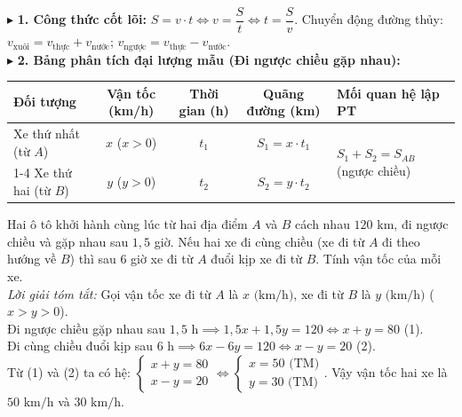 \documentclass[11pt,a4paper]{article}
\begin{document}

\vspace{0.5mm}
\noindent$\blacktriangleright$ \textbf{1. Công thức cốt lõi:} $S = v \cdot t \iff v = \dfrac{S}{t} \iff t = \dfrac{S}{v}$. Chuyển động đường thủy: $v_{\text{xuôi}} = v_{\text{thực}} + v_{\text{nước}}$; $v_{\text{ngược}} = v_{\text{thực}} - v_{\text{nước}}$.\\
$\blacktriangleright$ \textbf{2. Bảng phân tích đại lượng mẫu (Đi ngược chiều gặp nhau):}
\begin{center}
\small
\begin{tabular}{|l|c|c|c|l|}
\hline
\textbf{Đối tượng} & \textbf{Vận tốc (km/h)} & \textbf{Thời gian (h)} & \textbf{Quãng đường (km)} & \textbf{Mối quan hệ lập PT} \\ \hline
Xe thứ nhất (từ $A$) & $x$ ($x > 0$) & $t_1$ & $S_1 = x \cdot t_1$ & \multirow{2}{*}{$S_1 + S_2 = S_{AB}$ (ngược chiều)} \\ \cline{1-4}
Xe thứ hai (từ $B$) & $y$ ($y > 0$) & $t_2$ & $S_2 = y \cdot t_2$ & $S_1 - S_2 = S_{AB}$ (đuổi kịp) \\ \hline
\end{tabular}
\end{center}

\vspace{-0.5mm}
\begin{vidubox}
Hai ô tô khởi hành cùng lúc từ hai địa điểm $A$ và $B$ cách nhau $120\text{ km}$, đi ngược chiều và gặp nhau sau $1{,}5$ giờ. Nếu hai xe đi cùng chiều (xe đi từ $A$ đi theo hướng về $B$) thì sau $6$ giờ xe đi từ $A$ đuổi kịp xe đi từ $B$. Tính vận tốc của mỗi xe.\\
\textit{Lời giải tóm tắt:} Gọi vận tốc xe đi từ $A$ là $x\text{ (km/h)}$, xe đi từ $B$ là $y\text{ (km/h)}$ ($x > y > 0$).\\
Đi ngược chiều gặp nhau sau $1{,}5\text{ h} \implies 1{,}5x + 1{,}5y = 120 \iff x + y = 80$ (1).\\
Đi cùng chiều đuổi kịp sau $6\text{ h} \implies 6x - 6y = 120 \iff x - y = 20$ (2).\\
Từ (1) và (2) ta có hệ: $\begin{cases} x + y = 80 \\ x - y = 20 \end{cases} \iff \begin{cases} x = 50\text{ (TM)} \\ y = 30\text{ (TM)} \end{cases}$. Vậy vận tốc hai xe là $50\text{ km/h}$ và $30\text{ km/h}$.
\end{vidubox}
\end{document}
